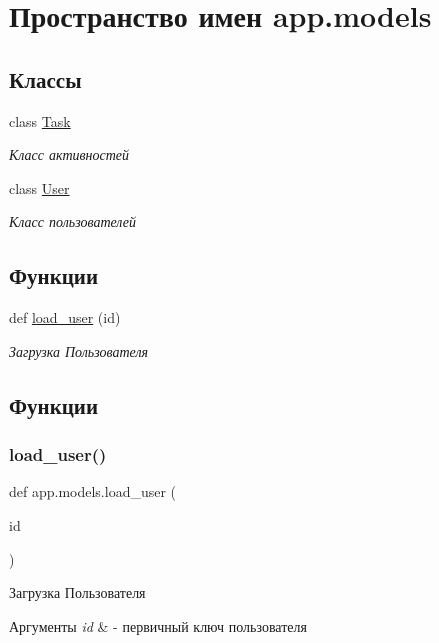 \hypertarget{namespaceapp_1_1models}{}\section{Пространство имен app.\+models}
\label{namespaceapp_1_1models}
\subsection*{Классы}
\begin{DoxyCompactItemize}
\item 
class \mbox{\hyperlink{classapp_1_1models_1_1_task}{Task}}
\begin{DoxyCompactList}\small\item\em Класс активностей \end{DoxyCompactList}\item 
class \mbox{\hyperlink{classapp_1_1models_1_1_user}{User}}
\begin{DoxyCompactList}\small\item\em Класс пользователей \end{DoxyCompactList}\end{DoxyCompactItemize}
\subsection*{Функции}
\begin{DoxyCompactItemize}
\item 
def \mbox{\hyperlink{namespaceapp_1_1models_a3d862de59e8282c7b45881c299a9266d}{load\+\_\+user}} (id)
\begin{DoxyCompactList}\small\item\em Загрузка Пользователя \end{DoxyCompactList}\end{DoxyCompactItemize}


\subsection{Функции}
\mbox{\label{namespaceapp_1_1models_a3d862de59e8282c7b45881c299a9266d}} 
\subsubsection{\texorpdfstring{load\+\_\+user()}{load\_user()}}
{\footnotesize\ttfamily def app.\+models.\+load\+\_\+user (\begin{DoxyParamCaption}\item[{}]{id }\end{DoxyParamCaption})}



Загрузка Пользователя 


\begin{DoxyParams}{Аргументы}
{\em id} & -\/ первичный ключ пользователя \\
\hline
\end{DoxyParams}
